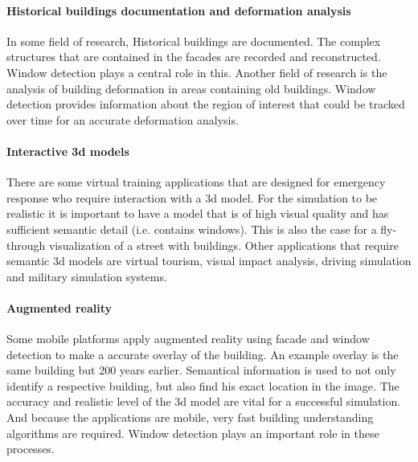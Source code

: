 \paragraph{Historical buildings documentation and deformation analysis}
	In some field of research, Historical buildings are documented. The complex
	structures that are contained in the facades are recorded and reconstructed.
	Window detection plays a central role in this. 
	Another field of research is the analysis of building deformation in areas
	containing old buildings.  Window detection provides information about the
	region of interest that could be tracked over time for an accurate
	deformation analysis.


\paragraph{Interactive 3d models}
	There are some virtual training applications that are designed for
	emergency response who require interaction with a 3d model.  
	For the simulation to be realistic it is important to have a model that is
	of high visual quality and has sufficient semantic detail (i.e. contains
	windows).  This is also the case for a fly-through visualization of a street with
	buildings.
	Other applications that require semantic 3d models are virtual tourism,
	visual impact analysis, driving simulation and military simulation systems.

\paragraph{Augmented reality}
	Some mobile platforms apply augmented reality using facade and window
	detection to make a accurate overlay of the building. An example overlay is the
	same building but 200 years earlier.  Semantical information is used to not
	only identify a respective building, but also find his exact location in the
	image.  The accuracy and realistic level of the 3d model are vital for a
	successful simulation.  And because the applications are mobile, very fast
	building understanding algorithms are required.  Window
	detection plays an important role in these processes.

